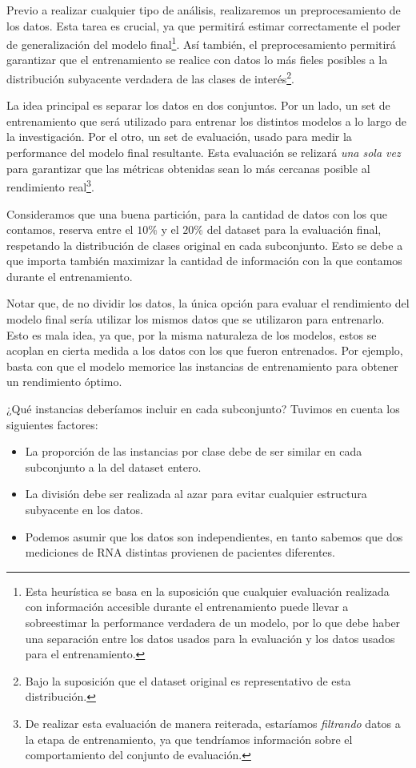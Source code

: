 Previo a realizar cualquier tipo de análisis, realizaremos un preprocesamiento de los datos. Esta tarea es crucial, ya que  permitirá estimar correctamente el poder de generalización del modelo final\footnote{Esta heurística se basa en la suposición que cualquier evaluación realizada con información accesible durante el entrenamiento puede llevar a sobreestimar la performance verdadera de un modelo, por lo que debe haber una separación entre los datos usados para la evaluación y los datos usados para el entrenamiento.}. Así también, el preprocesamiento permitirá garantizar que el entrenamiento se realice con datos lo más fieles posibles a la distribución subyacente verdadera de las clases de interés\footnote{Bajo la suposición que el dataset original es representativo de esta distribución.}. 

La idea principal es separar los datos en dos conjuntos. Por un lado, un set de entrenamiento que será utilizado para entrenar los distintos modelos a lo largo de la investigación. Por el otro, un set de evaluación, usado para medir la performance del modelo final resultante. Esta evaluación se relizará \textit{una sola vez} para garantizar que las métricas obtenidas sean lo más cercanas posible al rendimiento real\footnote{De realizar esta evaluación de manera reiterada, estaríamos \textit{filtrando} datos a la etapa de entrenamiento, ya que tendríamos información sobre el comportamiento del conjunto de evaluación.}.

Consideramos que una buena partición, para la cantidad de datos con los que contamos, reserva entre el $10\%$ y el $20\%$ del dataset para la evaluación final, respetando la distribución de clases original en cada subconjunto. Esto se debe a que importa también maximizar la cantidad de información con la que contamos durante el entrenamiento.

Notar que, de no dividir los datos, la única opción para evaluar el rendimiento del modelo final sería utilizar los mismos datos que se utilizaron para entrenarlo. Esto es mala idea, ya que, por la misma naturaleza de los modelos, estos se acoplan en cierta medida a los datos con los que fueron entrenados. Por ejemplo, basta con que el modelo memorice las instancias de entrenamiento para obtener un rendimiento óptimo.

¿Qué instancias deberíamos incluir en cada subconjunto? Tuvimos en cuenta los siguientes factores:

\begin{itemize}
    \item La proporción de las instancias por clase debe de ser similar en cada subconjunto a la del dataset entero.
    \item La división debe ser realizada al azar para evitar cualquier estructura subyacente en los datos.
    \item Podemos asumir que los datos son independientes, en tanto sabemos que dos mediciones de RNA distintas provienen de pacientes diferentes. 
\end{itemize}

